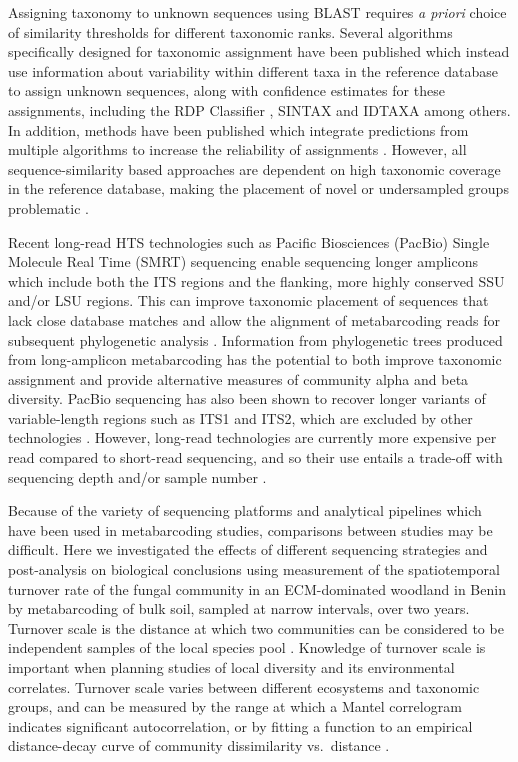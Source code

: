 \documentclass[
  12pt,
]{article}
\begin{document}
Assigning taxonomy to unknown sequences using BLAST requires \emph{a priori} choice of similarity thresholds for different taxonomic ranks.
Several algorithms specifically designed for taxonomic assignment have been published which instead use information about variability within different taxa in the reference database to assign unknown sequences, along with confidence estimates for these assignments, including the RDP Classifier \autocite[RDPC,][]{wang2007}, SINTAX \autocite{edgar2016a} and IDTAXA \autocite{murali2018a} among others.
In addition, methods have been published which integrate predictions from multiple algorithms to increase the reliability of assignments \autocite{somervuo2016,gdanetz2017,palmer2018}.
However, all sequence-similarity based approaches are dependent on high taxonomic coverage in the reference database, making the placement of novel or undersampled groups problematic \autocite{nilsson2016top,Tedersoo2018}.

Recent long-read HTS technologies such as Pacific Biosciences (PacBio) Single Molecule Real Time (SMRT) sequencing enable sequencing longer amplicons which include both the ITS regions and the flanking, more highly conserved SSU and/or LSU regions.
This can improve taxonomic placement of sequences that lack close database matches and allow the alignment of metabarcoding reads for subsequent phylogenetic analysis \autocite{Tedersoo2018}.
Information from phylogenetic trees produced from long-amplicon metabarcoding has the potential to both improve taxonomic assignment and provide alternative measures of community alpha and beta diversity.
PacBio sequencing has also been shown to recover longer variants of variable-length regions such as ITS1 and ITS2, which are excluded by other technologies \autocite{castano2020}.
However, long-read technologies are currently more expensive per read compared to short-read sequencing, and so their use entails a trade-off with sequencing depth and/or sample number \autocite{Kennedy2018}.

Because of the variety of sequencing platforms and analytical pipelines which have been used in metabarcoding studies, comparisons between studies may be difficult.
Here we investigated the effects of different sequencing strategies and post-analysis on biological conclusions using measurement of the spatiotemporal turnover rate of the fungal community in an ECM-dominated woodland in Benin by metabarcoding of bulk soil, sampled at narrow intervals, over two years.
Turnover scale is the distance at which two communities can be considered to be independent samples of the local species pool \autocite{legendre2012}.
Knowledge of turnover scale is important when planning studies of local diversity and its environmental correlates.
Turnover scale varies between different ecosystems and taxonomic groups,
and can be measured by the range at which a Mantel correlogram indicates significant autocorrelation,
or by fitting a function to an empirical distance-decay curve of community dissimilarity vs.~distance \autocite{legendre2012}.
\end{document}
